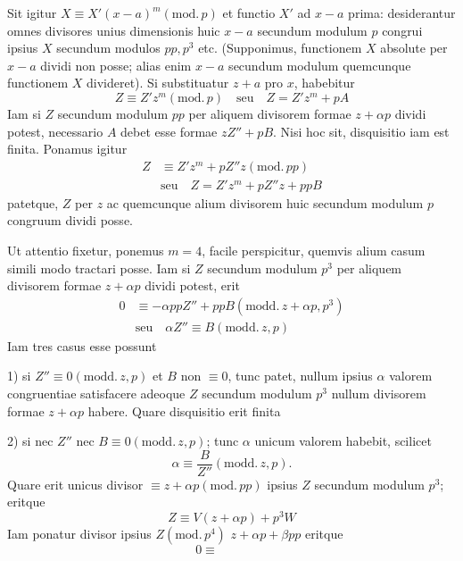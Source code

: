 Sit igitur $X\equiv X'(x-a)^m(\mathrm{mod.}\,p)$ et functio $X'$ ad $x-a$ prima: desiderantur omnes divisores unius dimensionis huic $x-a$ secundum modulum $p$ congrui ipsius $X$ secundum modulos $pp,p^3$ etc. (Supponimus, functionem $X$ absolute per $x-a$ dividi non posse; alias enim $x-a$ secundum modulum quemcunque functionem $X$ divideret). Si substituatur $z+a$ pro $x$, habebitur
\[
Z\equiv Z'z^m(\mathrm{mod.}\,p)\quad\text{seu}\quad Z=Z'z^m+pA
\]
Iam si $Z$ secundum modulum $pp$ per aliquem divisorem formae $z+\alpha p$ dividi potest, necessario $A$ debet esse formae $zZ''+pB$. Nisi hoc sit, disquisitio iam est finita. Ponamus igitur
\[
\begin{aligned}
Z&\equiv Z'z^m+pZ''z(\mathrm{mod.}\,pp)\\
&\text{seu}\quad Z=Z'z^m+pZ''z+ppB
\end{aligned}
\]
patetque, $Z$ per $z$ ac quemcunque alium divisorem huic secundum modulum $p$ congruum dividi posse.

Ut attentio fixetur, ponemus $m=4$, facile perspicitur, quemvis alium casum simili modo tractari posse. Iam si $Z$ secundum modulum $p^3$ per aliquem divisorem formae $z+\alpha p$ dividi potest, erit
\[
\begin{aligned}
0&\equiv-\alpha ppZ''+ppB(\mathrm{modd.}\,z+\alpha p,p^3)\\
&\text{seu}\quad\alpha Z''\equiv B(\mathrm{modd.}\,z,p)
\end{aligned}
\]
Iam tres casus esse possunt

1) si $Z''\equiv0(\mathrm{modd.}\,z,p)$ et $B$ non $\equiv0$, tunc patet, nullum ipsius $\alpha$ valorem congruentiae satisfacere adeoque $Z$ secundum modulum $p^3$ nullum divisorem formae $z+\alpha p$ habere. Quare disquisitio erit finita

2) si nec $Z''$ nec $B\equiv0(\mathrm{modd.}\,z,p)$; tunc $\alpha$ unicum valorem habebit, scilicet
\[
\alpha\equiv\frac B{Z''}(\mathrm{modd.}\,z,p).
\]
Quare erit unicus divisor $\equiv z+\alpha p(\mathrm{mod.}\,pp)$ ipsius $Z$ secundum modulum $p^3$; eritque
\[
Z\equiv V(z+\alpha p)+p^3W
\]
Iam ponatur divisor ipsius $Z(\mathrm{mod.}\,p^4)$ $z+\alpha p+\beta pp$ eritque
\[
0\equiv\qquad\qquad
\]
